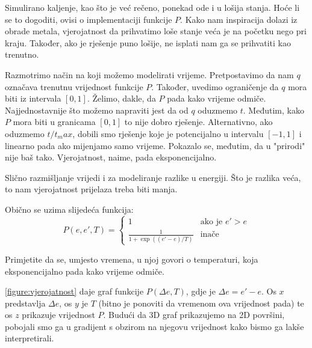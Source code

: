 \documentclass[times, utf8, zavrsni]{fer}
\begin{document}
Simulirano kaljenje, kao što je već rečeno, ponekad ode i u lošija
stanja. Hoće li se to dogoditi, ovisi o implementaciji funkcije
$P$. Kako nam inspiracija dolazi iz obrade metala, vjerojatnost da
prihvatimo loše stanje veća je na početku nego pri kraju. Također,
ako je rješenje puno lošije, ne isplati nam ga se prihvatiti kao
trenutno. 

Razmotrimo način na koji možemo modelirati vrijeme. Pretpostavimo
da nam $q$ označava trenutnu vrijednost funkcije $P$. Također,
uvedimo ograničenje da $q$ mora biti iz intervala $[0, 1]$.
Želimo, dakle, da $P$ pada kako vrijeme odmiče. Najjednostavnije
što možemo napraviti jest da od $q$ oduzmemo $t$. Međutim,
kako $P$ mora biti u granicama $[0, 1]$ to nije dobro rješenje.
Alternativno, ako oduzmemo $t/t_max$, dobili smo rješenje koje
je potencijalno u intervalu $[-1, 1]$ i linearno pada
ako mijenjamo samo vrijeme. Pokazalo se, međutim, da u "prirodi"
nije baš tako. Vjerojatnost, naime, pada eksponencijalno. 

Slično razmišljanje vrijedi i za modeliranje razlike u energiji.
Što je razlika veća, to nam vjerojatnost prijelaza treba biti manja.

Obično se uzima slijedeća funkcija: 
$$
P(e, e', T) = 
\left\{ \begin{array}{ll}
	1 & \mbox{ako je } e' > e \\
	\frac{1}{1+\exp ((e'-e)/T)} & \mbox{inače}
\end{array} \right.
$$

Primjetite da se, umjesto vremena, u njoj govori o temperaturi,
koja eksponencijalno pada kako vrijeme odmiče. 

\autoref{figure:vjerojatnost} daje graf funkcije $P(\Delta e, T)$, gdje
je $\Delta e = e'-e$. Os
$x$ predstavlja $\Delta e$, os $y$ je $T$ (bitno je ponoviti da
vremenom ova vrijednost pada) te os $z$ prikazuje vrijednost $P$. 
Budući da 3D graf prikazujemo na 2D površini, pobojali smo ga
u gradijent s obzirom na njegovu vrijednost kako bismo ga lakše 
interpretirali. 
\end{document}
